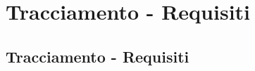 \section{Tracciamento  - Requisiti}
\subsection{Tracciamento  - Requisiti}
\normalsize
%
%

\newpage
